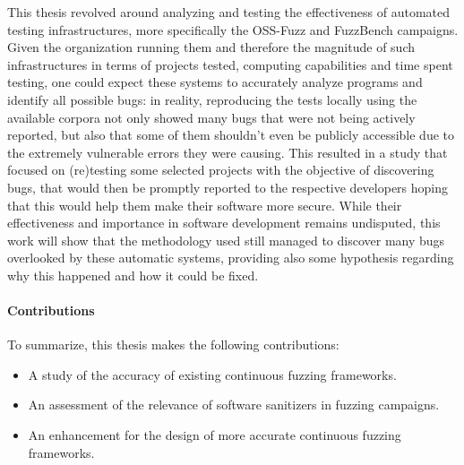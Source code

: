 This thesis revolved around analyzing and testing the effectiveness of automated testing infrastructures, more specifically the OSS-Fuzz and FuzzBench campaigns.
\newline
Given the organization running them and therefore the magnitude of such infrastructures in terms of projects tested, computing capabilities and time spent testing, one could expect these systems to accurately analyze programs and identify all possible bugs: in reality, reproducing the tests locally using the available corpora not only showed many bugs that were not being actively reported, but also that some of them shouldn't even be publicly accessible due to the extremely vulnerable errors they were causing.
\newline
This resulted in a study that focused on (re)testing some selected projects with the objective of discovering bugs, that would then be promptly reported to the respective developers hoping that this would help them make their software more secure. 
\newline
While their effectiveness and importance in software development remains undisputed, this work will show that the methodology used still managed to discover many bugs overlooked by these automatic systems, providing also some hypothesis regarding why this happened and how it could be fixed.

\paragraph{Contributions}

To summarize, this thesis makes the following contributions:
\begin{itemize}
    \item A study of the accuracy of existing continuous fuzzing frameworks.
    \item An assessment of the relevance of software sanitizers in fuzzing campaigns.
    \item An enhancement for the design of more accurate continuous fuzzing frameworks.
\end{itemize}



\newpage
